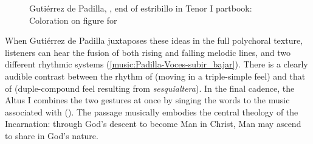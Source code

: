 \begin{figure}
    \caption{Gutiérrez de Padilla, , end of
    estribillo in Tenor I partbook: Coloration on figure for }

    \label{fig:Padilla-Voces-TI-bajar}
\end{figure}

When Gutiérrez de Padilla juxtaposes these ideas in the full polychoral texture,
listeners can hear the fusion of both rising and falling melodic lines, and two
different rhythmic systems (\cref{music:Padilla-Voces-subir_bajar}).
There is a clearly audible contrast between the rhythm of  (moving in a triple-simple feel) and that of 
(duple-compound feel resulting from \emph{sesquialtera}).
In the final cadence, the Altus I combines the two gestures at once by singing
the words  to the music associated with
 ().
The passage musically embodies the central theology of the Incarnation: through
God's descent to become Man in Christ, Man may ascend to share in God's nature.

\begin{musicexample}
    \caption{Gutiérrez de Padilla, , estribillo
    (): Contrasting motives and rhythmic patterns for
     and }

    \label{music:Padilla-Voces-subir_bajar}
\end{musicexample}

